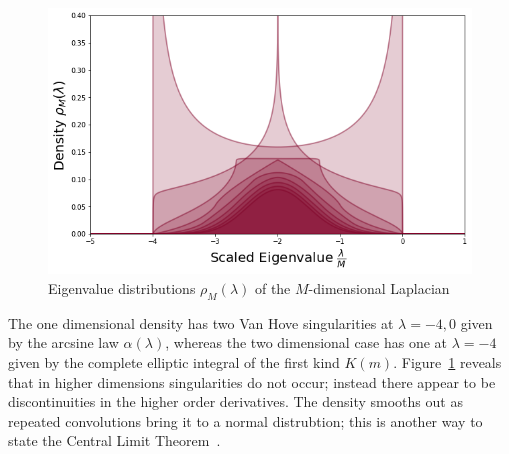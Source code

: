 \documentclass{article}[12pt]
\numberwithin{equation}{section}
\begin{document}
\begin{figure}[H]
\centering{}
\captionsetup{justification=centering}
\includegraphics[scale=0.45]{figures/density}
\caption{Eigenvalue distributions $\rho_M(\lambda)$ of the $M$-dimensional Laplacian}
\label{fig:dos}
\end{figure}
\noindent
The one dimensional density has two Van Hove singularities at $\lambda=-4,0$
given by the arcsine law $\alpha(\lambda)$, whereas the two dimensional
case has one at $\lambda=-4$ given by the complete elliptic integral
of the first kind $K(m)$. Figure~\ref{fig:dos} reveals that in higher
dimensions singularities do not occur; instead there appear to be
discontinuities in the higher order derivatives. The density smooths out
as repeated convolutions bring it to a normal distrubtion; this is another
way to state the Central Limit Theorem~\cite{}.
\end{document}
